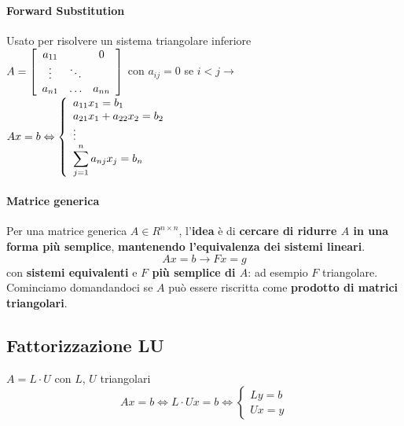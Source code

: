 \documentclass[10pt]{book}
\begin{document}
\paragraph{Forward Substitution}
Usato per risolvere un sistema triangolare inferiore\\
	\begin{math}
	A = \left[
	\begin{array}{c c c}
	a_{11} & & 0\\
	\vdots & \ddots\\
	a_{n1} & \ldots & a_{nn}
	\end{array}
	\right]
	\end{math}
	con $a_{ij} = 0$ se $i < j \rightarrow$
	\begin{math}
	Ax = b \Leftrightarrow \left\{
	\begin{array}{l}
		a_{11}x_1 = b_1\\
		a_{21}x_1 + a_{22}x_2 = b_2\\
		\vdots\\
		\mathlarger{\sum_{j = 1}^n a_{nj}x_j = b_n}\\
	\end{array}
	\right.
	\end{math}
\paragraph{Matrice generica} Per una matrice generica $A \in R^{n \times n}$, l'\textbf{idea} è di \textbf{cercare di ridurre $A$ in una forma più semplice}, \textbf{mantenendo l'equivalenza dei sistemi lineari}.
$$Ax = b \longrightarrow Fx = g$$ con \textbf{sistemi equivalenti} e \textbf{$F$ più semplice di $A$}: ad esempio $F$ triangolare.\\
Cominciamo domandandoci se $A$ può essere riscritta come \textbf{prodotto di matrici triangolari}.
\subsection{Fattorizzazione LU}
$A = L\cdot U$ con $L$, $U$ triangolari
$$Ax = b \Leftrightarrow L\cdot Ux = b \Leftrightarrow \left\{ \begin{array}{l}
	Ly = b\\
	Ux = y
\end{array}
\right.$$
\end{document}
